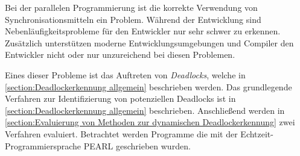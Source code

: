 Bei der parallelen Programmierung ist die korrekte Verwendung von
Synchronisationsmitteln ein Problem. Während der Entwicklung sind
Nebenläufigkeitsprobleme für den Entwickler nur sehr schwer zu erkennen.
Zusätzlich unterstützen moderne Entwicklungsumgebungen und Compiler den
Entwickler nicht oder nur unzureichend bei diesen Problemen.

Eines dieser Probleme ist das Auftreten von \textit{Deadlocks}, welche in
\cref{section:Deadlockerkennung allgemein} beschrieben werden.
Das grundlegende Verfahren zur Identifizierung von potenziellen Deadlocks
ist in \cref{section:Deadlockerkennung allgemein} beschrieben. Anschließend
werden in \cref{section:Evaluierung von Methoden zur dynamischen
Deadlockerkennung} zwei Verfahren evaluiert. Betrachtet werden Programme die mit
der Echtzeit-Programmiersprache PEARL\autocite{PEARL} geschrieben wurden.

